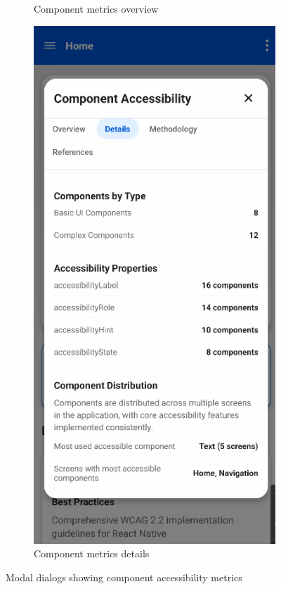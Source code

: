 \begin{figure}[ht]
\begin{subfigure}[b]{0.48\textwidth}
        \caption{Component metrics overview}
        \label{fig:component-overview-modal}
    \end{subfigure}
    \hfill
    \begin{subfigure}[b]{0.48\textwidth}
        \centering
        \includegraphics[width=\linewidth]{img/component-details.png}
        \caption{Component metrics details}
        \label{fig:component-details-modal}
    \end{subfigure}
    \caption{Modal dialogs showing component accessibility metrics}
    \label{fig:component_modal_pair}
\end{figure}

